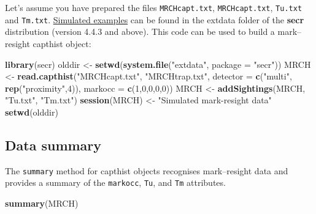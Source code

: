 \documentclass[
]{book}
\newenvironment{Shaded}{\begin{snugshade}}{\end{snugshade}}
\newcommand{\AttributeTok}[1]{\textcolor[rgb]{0.13,0.29,0.53}{#1}}
\newcommand{\DecValTok}[1]{\textcolor[rgb]{0.00,0.00,0.81}{#1}}
\newcommand{\FunctionTok}[1]{\textcolor[rgb]{0.13,0.29,0.53}{\textbf{#1}}}
\newcommand{\NormalTok}[1]{#1}
\newcommand{\OtherTok}[1]{\textcolor[rgb]{0.56,0.35,0.01}{#1}}
\newcommand{\StringTok}[1]{\textcolor[rgb]{0.31,0.60,0.02}{#1}}
\begin{document}
Let's assume you have prepared the files \texttt{MRCHcapt.txt}, \texttt{MRCHcapt.txt}, \texttt{Tu.txt} and \texttt{Tm.txt}. \hyperref[appendix5]{Simulated examples} can be found in the extdata folder of the \textbf{secr} distribution (version 4.4.3 and above). This code can be used to build a mark--resight capthist object:

\begin{Shaded}
\begin{Highlighting}[]
\FunctionTok{library}\NormalTok{(secr)}
\NormalTok{olddir }\OtherTok{\textless{}{-}} \FunctionTok{setwd}\NormalTok{(}\FunctionTok{system.file}\NormalTok{(}\StringTok{"extdata"}\NormalTok{, }\AttributeTok{package =} \StringTok{"secr"}\NormalTok{))}
\NormalTok{MRCH }\OtherTok{\textless{}{-}} \FunctionTok{read.capthist}\NormalTok{(}\StringTok{"MRCHcapt.txt"}\NormalTok{, }\StringTok{"MRCHtrap.txt"}\NormalTok{, }\AttributeTok{detector =} \FunctionTok{c}\NormalTok{(}\StringTok{"multi"}\NormalTok{, }
                      \FunctionTok{rep}\NormalTok{(}\StringTok{"proximity"}\NormalTok{,}\DecValTok{4}\NormalTok{)), }\AttributeTok{markocc =} \FunctionTok{c}\NormalTok{(}\DecValTok{1}\NormalTok{,}\DecValTok{0}\NormalTok{,}\DecValTok{0}\NormalTok{,}\DecValTok{0}\NormalTok{,}\DecValTok{0}\NormalTok{))}
\NormalTok{MRCH }\OtherTok{\textless{}{-}} \FunctionTok{addSightings}\NormalTok{(MRCH, }\StringTok{"Tu.txt"}\NormalTok{, }\StringTok{"Tm.txt"}\NormalTok{)}
\FunctionTok{session}\NormalTok{(MRCH) }\OtherTok{\textless{}{-}} \StringTok{"Simulated mark{-}resight data"}
\FunctionTok{setwd}\NormalTok{(olddir)}
\end{Highlighting}
\end{Shaded}

\subsection{Data summary}\label{data-summary}

The \texttt{summary} method for capthist objects recognises mark--resight data and provides a summary of the \texttt{markocc}, \texttt{Tu}, and \texttt{Tm} attributes.

\begin{Shaded}
\begin{Highlighting}[]
\FunctionTok{summary}\NormalTok{(MRCH)}
\end{Highlighting}
\end{Shaded}
\end{document}
